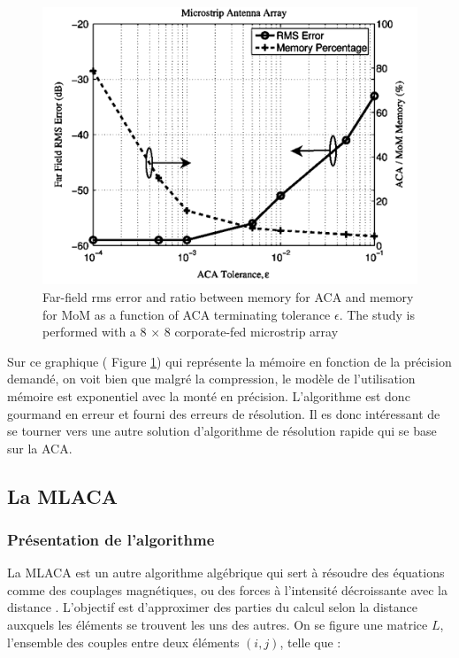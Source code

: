 \documentclass[10pt]{SelfArx} %
\begin{document}
\begin{figure}[ht]\centering
	\includegraphics[width=\linewidth]{zhao_tolerance_ACA.png}
	\captionsetup{justification=centering}
	\caption{Far-field rms error and ratio between memory for ACA and memory for MoM as a function of ACA terminating tolerance $\epsilon$. The study is performed with a 8 × 8 corporate-fed microstrip array \cite{zhao_adaptive_2005}}
	\label{fig:zhao_tolerance_ACA}
\end{figure}

Sur ce graphique ( Figure \ref{fig:zhao_tolerance_ACA}) qui représente la mémoire en fonction de la précision demandé, on voit bien que malgré la compression, le modèle de l'utilisation mémoire est exponentiel avec la monté en précision. L'algorithme est donc gourmand en erreur et fourni des erreurs de résolution. Il es donc intéressant de se tourner vers une autre solution d'algorithme de résolution rapide qui se base sur la ACA.

\subsection{La MLACA}
\subsubsection{Présentation de l'algorithme}
La MLACA est un autre algorithme algébrique qui sert à résoudre des équations comme des couplages magnétiques, ou des forces à l'intensité décroissante avec la distance \cite{nel_efficient_2019}. L'objectif est d'approximer des parties du calcul selon la distance auxquels les éléments se trouvent les uns des autres. On se figure une matrice $L$, l'ensemble des couples entre deux éléments $(i,j)$, telle que :
\end{document}
